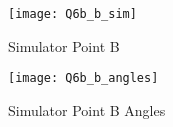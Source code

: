 	\begin{figure}[position = here]
		\begin{centering}
			\texttt{[image: Q6b\_b\_sim]}\\
			\caption [SIMB1]{Simulator Point B}
		\end{centering}
	\end{figure}

	\begin{figure}[position = here]
		\begin{centering}
			\texttt{[image: Q6b\_b\_angles]}\\
			\caption [SIMB2]{Simulator Point B Angles}
		\end{centering}
	\end{figure}
\pagebreak